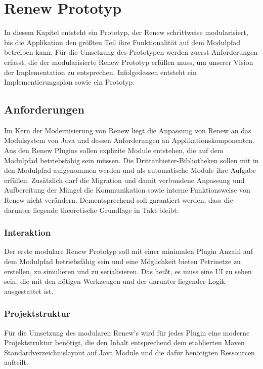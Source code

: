 \chapter{Renew Prototyp} 
	In diesem Kapitel entsteht ein Prototyp, der Renew schrittweise modularisiert, bis die Applikation den größten Teil ihre Funktionalität auf dem Modulpfad betreiben kann. \newline
	Für die Umsetzung des Prototypen werden zuerst Anforderungen erfasst, die der modularisierte Renew Prototyp erfüllen muss, um unserer Vision der Implementation zu entsprechen. Infolgedessen entsteht ein Implementierungsplan sowie ein Prototyp. 

\section{Anforderungen} \label{sec:anforderungen}
	Im Kern der Modernisierung von Renew liegt die Anpassung von Renew an das Modulsystem von Java und dessen Anforderungen an Applikationskomponenten. Aus den Renew Plugins sollen explizite Module entstehen, die auf dem Modulpfad betriebsfähig sein müssen. Die Drittanbieter-Bibliotheken sollen mit in den Modulpfad aufgenommen werden und als automatische Module ihre Aufgabe erfüllen. Zusätzlich darf die Migration und damit verbundene Anpassung und Aufbereitung der Mängel die Kommunikation sowie interne Funktionsweise von Renew nicht verändern. Dementsprechend soll garantiert werden, dass die darunter liegende theoretische Grundlage in Takt bleibt. 

\subsection{Interaktion}
	Der erste modulare Renew Prototyp soll mit einer minimalen Plugin Anzahl auf dem Modulpfad betriebsfähig sein und eine Möglichkeit bieten Petrinetze zu erstellen, zu simulieren und zu serialisieren. Das heißt, es muss eine UI zu sehen sein, die mit den nötigen Werkzeugen und der darunter liegender Logik ausgestattet ist. 

\subsection{Projektstruktur}
	Für die Umsetzung des modularen Renew's wird für jedes Plugin eine moderne Projektstruktur benötigt, die den Inhalt entsprechend dem etablierten Maven Standardverzeichnislayout auf Java Module und die dafür benötigten Ressourcen aufteilt. 

